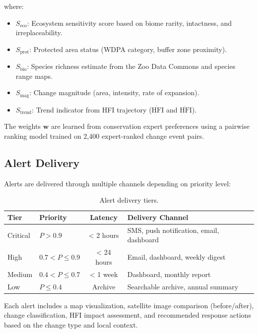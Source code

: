 \noindent where:
\begin{itemize}[leftmargin=*]
    \item $S_{\text{eco}}$: Ecosystem sensitivity score based on biome rarity, intactness, and irreplaceability.
    \item $S_{\text{prot}}$: Protected area status (WDPA category, buffer zone proximity).
    \item $S_{\text{bio}}$: Species richness estimate from the Zoo Data Commons and species range maps.
    \item $S_{\text{mag}}$: Change magnitude (area, intensity, rate of expansion).
    \item $S_{\text{trend}}$: Trend indicator from HFI trajectory ($\dot{\text{HFI}}$ and $\ddot{\text{HFI}}$).
\end{itemize}

The weights $\mathbf{w}$ are learned from conservation expert preferences using a pairwise ranking model trained on 2,400 expert-ranked change event pairs.

\subsection{Alert Delivery}

Alerts are delivered through multiple channels depending on priority level:

\begin{table}[H]
\centering
\caption{Alert delivery tiers.}
\label{tab:alert_tiers}
\begin{tabularx}{\textwidth}{@{}llcX@{}}
\toprule
\textbf{Tier} & \textbf{Priority} & \textbf{Latency} & \textbf{Delivery Channel} \\
\midrule
Critical & $P > 0.9$ & < 2 hours & SMS, push notification, email, dashboard \\
High & $0.7 < P \leq 0.9$ & < 24 hours & Email, dashboard, weekly digest \\
Medium & $0.4 < P \leq 0.7$ & < 1 week & Dashboard, monthly report \\
Low & $P \leq 0.4$ & Archive & Searchable archive, annual summary \\
\bottomrule
\end{tabularx}
\end{table}

Each alert includes a map visualization, satellite image comparison (before/after), change classification, HFI impact assessment, and recommended response actions based on the change type and local context.

